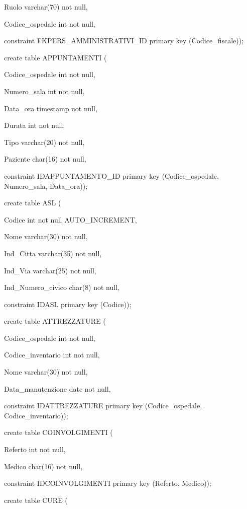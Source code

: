 \documentclass[a4paper,12pt]{report}
\begin{document}
     Ruolo varchar(70) not null,

     Codice\_ospedale int not null,

     constraint FKPERS\_AMMINISTRATIVI\_ID primary key (Codice\_fiscale)); \newline

\noindent create table APPUNTAMENTI (

     Codice\_ospedale int not null,

     Numero\_sala int not null,

     Data\_ora timestamp not null,

     Durata int not null,

     Tipo varchar(20) not null,

     Paziente char(16) not null,

     constraint IDAPPUNTAMENTO\_ID primary key (Codice\_ospedale, Numero\_sala, Data\_ora)); \newline

\noindent create table ASL (

     Codice int not null AUTO\_INCREMENT,

     Nome varchar(30) not null,

     Ind\_Citta varchar(35) not null,

     Ind\_Via varchar(25) not null,

     Ind\_Numero\_civico char(8) not null,

     constraint IDASL primary key (Codice)); \newline

\noindent create table ATTREZZATURE (

     Codice\_ospedale int not null,

     Codice\_inventario int not null,

     Nome varchar(30) not null,

     Data\_manutenzione date not null,

     constraint IDATTREZZATURE primary key (Codice\_ospedale, Codice\_inventario)); \newline

\noindent create table COINVOLGIMENTI (

     Referto int not null,

     Medico char(16) not null,

     constraint IDCOINVOLGIMENTI primary key (Referto, Medico)); \newline

\noindent create table CURE (
\end{document}
